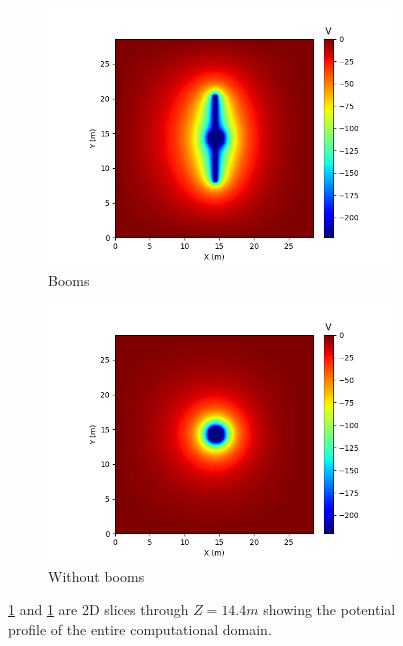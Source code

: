 \begin{center}
\begin{figure}[H]
  \begin{subfigure}[b]{0.61\textwidth}
    \includegraphics[width=\textwidth]{figures/MMO/noPH/WB/P_noPH_WB.png}
    \caption{Booms}
    \label{fig:P_noPH_WB}
  \end{subfigure}
  \hfill
  \begin{subfigure}[b]{0.61\textwidth}
    \includegraphics[width=\textwidth]{figures/MMO/noPH/NB/P_noPH_NB.png}
    \caption{Without booms}
    \label{fig:P_noPH_NB}
  \end{subfigure}
  \caption{\ref{fig:P_noPH_WB} and \ref{fig:P_noPH_WB} are 2D slices through $Z = 14.4 m$ showing the potential profile of the entire computational domain.}    \label{fig:PMMOnoPH}
\end{figure}
\end{center}


